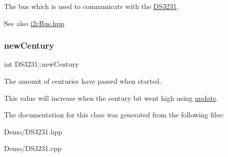 The bus which is used to communicate with the \mbox{\hyperlink{class_d_s3231}{D\+S3231}}. 

\begin{DoxySeeAlso}{See also}
\mbox{\hyperlink{i2c_bus_8hpp_source}{i2c\+Bus.\+hpp}} 
\end{DoxySeeAlso}
\mbox{\label{class_d_s3231_a15fb987b624cdddde40a15db36665221}} 
\subsubsection{\texorpdfstring{new\+Century}{newCentury}}
{\footnotesize\ttfamily int D\+S3231\+::new\+Century\hspace{0.3cm}{\ttfamily [private]}}



The amount of centuries have passed when started. 

This value will increase when the century bit went high using \mbox{\hyperlink{class_d_s3231_a143ec57122d892ea0ec671a153352f2c}{update}}. 

The documentation for this class was generated from the following files\+:\begin{DoxyCompactItemize}
\item 
Demo/D\+S3231.\+hpp\item 
Demo/D\+S3231.\+cpp\end{DoxyCompactItemize}
